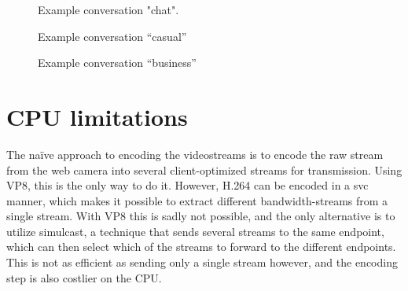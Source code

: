 \begin{figure}[ht!]
\centering
    \caption{Example conversation "chat".}\label{fig:example-conv-chat}
\end{figure}

\begin{figure}[ht!]
\centering
    \caption{Example conversation ``casual''}\label{fig:example-conv-casual}
\end{figure}

\begin{figure}[ht!]
\centering
    \caption{Example conversation ``business''}\label{fig:example-conv-business}
\end{figure}


\section{CPU limitations}

The naïve approach to encoding the videostreams is to encode the raw stream from the web camera into several client-optimized streams for transmission. Using VP8, this is the only way to do it. However, H.264 can be encoded in a \gls{svc} manner, which makes it possible to extract different bandwidth-streams from a single stream. With VP8 this is sadly not possible, and the only alternative is to utilize \gls{simulcast}, a technique that sends several streams to the same endpoint, which can then select which of the streams to forward to the different endpoints. This is not as efficient as sending only a single stream however, and the encoding step is also costlier on the CPU.

